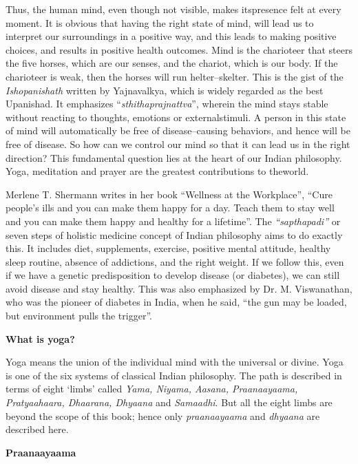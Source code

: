 Thus, the human mind, even though not visible, makes its\break presence felt at every moment. It is obvious that having the right state of mind, will lead us to interpret our surroundings in a positive way, and this leads to making positive choices, and results in positive health outcomes. Mind is the charioteer that steers the five horses, which are our senses, and the chariot, which is our body. If the chario\-teer is weak, then the horses will run helter–skelter. This is the gist of the \textit{Ishopanishath} written by Yajnavalkya, which is widely regarded as the best Upanishad. It emphasizes “\textit{sthithaprajnattva}”, wherein the mind stays stable without reacting to thoughts, emotions or external\break stimuli. A person in this state of mind will automatically be free of disease–causing behaviors, and hence will be free of disease. So how can we control our mind so that it can lead us in the right direction? This fundamental question lies at the heart of our Indian philosophy. Yoga, meditation and prayer are the greatest contributions to the\break world.

Merlene T. Shermann writes in her book “Wellness at the Workplace”, “Cure people’s ills and you can make them happy for a day. Teach them to stay well and you can make them happy and healthy for a lifetime”. The \textit{“sapthapadi”} or seven steps of holistic medicine concept of Indian philosophy aims to do exactly this. It includes diet, supplements, exercise, positive mental attitude, healthy sleep routine, absence of addictions, and the right weight. If we follow this, even if we have a genetic predisposition to develop disease (or diabetes), we can still avoid disease and stay healthy. This was also emphasized by Dr. M. Viswanathan, who was the pioneer of diabetes in India, when he said, “the gun may be loaded, but environment pulls the trigger”.


\noindent\textbf{What is yoga?}

Yoga means the union of the individual mind with the universal or divine. Yoga is one of the six systems of classical Indian philo\-sophy. The path is described in terms of eight ‘limbs’ called \textit{Yama, Niyama, Aasana, Praanaayaama, Pratyaahaara, Dhaarana, Dhyaana} and \textit{Samaadhi}. But all the eight limbs are beyond the scope of this book; hence only \textit{praanaayaama} and \textit{dhyaana} are described here.

\noindent\textbf{Praanaayaama}

